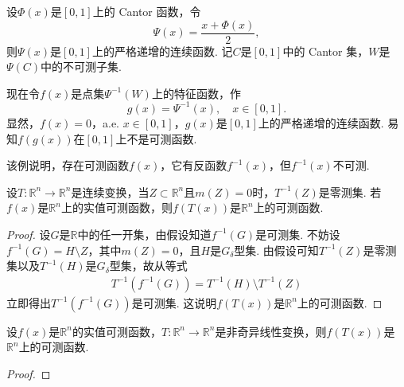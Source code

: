 \documentclass[../../main.tex]{subfiles}%
\begin{document}
\begin{example}\label{example:复合函数的可测性反例1}
设\(\varPhi(x)\)是\([0, 1]\)上的 Cantor 函数，令
\[
\varPsi(x)=\frac{x+\varPhi(x)}{2},
\]
则\(\varPsi(x)\)是\([0, 1]\)上的严格递增的连续函数. 记\(C\)是\([0, 1]\)中的 Cantor 集，\(W\)是\(\varPsi(C)\)中的不可测子集.

现在令\(f(x)\)是点集\(\varPsi^{-1}(W)\)上的特征函数，作
\[
g(x)=\varPsi^{-1}(x),\quad x\in[0, 1].
\]
显然，\(f(x) = 0\)，a.e. \(x \in [0, 1]\)，\(g(x)\)是\([0, 1]\)上的严格递增的连续函数. 易知\(f(g(x))\)在\([0, 1]\)上不是可测函数.
\end{example}
\begin{remark}
该例说明，存在可测函数\(f(x)\)，它有反函数\(f^{-1}(x)\)，但\(f^{-1}(x)\)不可测. 
\end{remark}

\begin{theorem}
设\(T: \mathbb{R}^{n} \to \mathbb{R}^{n}\)是连续变换，当\(Z \subset \mathbb{R}^{n}\)且\(m(Z) = 0\)时，\(T^{-1}(Z)\)是零测集. 若\(f(x)\)是\(\mathbb{R}^{n}\)上的实值可测函数，则\(f(T(x))\)是\(\mathbb{R}^{n}\)上的可测函数.
\end{theorem}
\begin{proof}

设\(G\)是\(\mathbb{R}\)中的任一开集，由假设知道\(f^{-1}(G)\)是可测集. 不妨设\(f^{-1}(G) = H \setminus Z\)，其中\(m(Z) = 0\)，且\(H\)是\(G_{\delta}\)型集. 由假设可知\(T^{-1}(Z)\)是零测集以及\(T^{-1}(H)\)是\(G_{\delta}\)型集，故从等式
\begin{align*}
T^{-1}(f^{-1}(G)) = T^{-1}(H) \setminus T^{-1}(Z)
\end{align*}
立即得出\(T^{-1}(f^{-1}(G))\)是可测集. 这说明\(f(T(x))\)是\(\mathbb{R}^{n}\)上的可测函数.

\end{proof}

\begin{corollary}
设\(f(x)\)是\(\mathbb{R}^{n}\)的实值可测函数，\(T: \mathbb{R}^{n} \to \mathbb{R}^{n}\)是非奇异线性变换，则\(f(T(x))\)是\(\mathbb{R}^{n}\)上的可测函数.
\end{corollary}
\begin{proof}



\end{proof}
\end{document}
